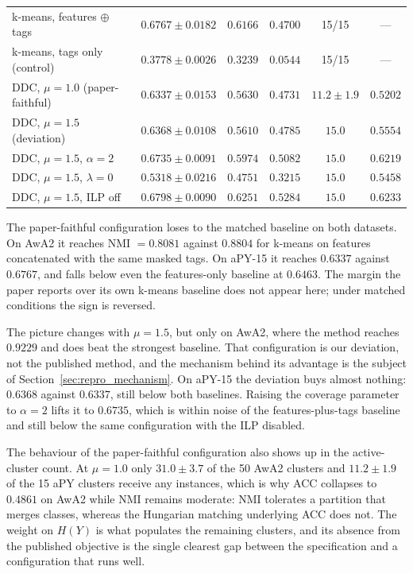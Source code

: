 \begin{table}[H]
\begin{tabular}{lccccc}
        k-means, features $\oplus$ tags & $\mathbf{0.6767 \pm 0.0182}$ & $0.6166$ & $0.4700$ & 15/15 & --- \\
        k-means, tags only (control) & $0.3778 \pm 0.0026$ & $0.3239$ & $0.0544$ & 15/15 & --- \\
        DDC, $\mu = 1.0$ (paper-faithful) & $0.6337 \pm 0.0153$ & $0.5630$ & $0.4731$ & $11.2 \pm 1.9$ & $0.5202$ \\
        DDC, $\mu = 1.5$ (deviation) & $0.6368 \pm 0.0108$ & $0.5610$ & $0.4785$ & $15.0$ & $0.5554$ \\
        DDC, $\mu = 1.5$, $\alpha = 2$ & $0.6735 \pm 0.0091$ & $0.5974$ & $0.5082$ & $15.0$ & $0.6219$ \\
        DDC, $\mu = 1.5$, $\lambda = 0$ & $0.5318 \pm 0.0216$ & $0.4751$ & $0.3215$ & $15.0$ & $0.5458$ \\
        DDC, $\mu = 1.5$, ILP off & $\mathbf{0.6798 \pm 0.0090}$ & $0.6251$ & $0.5284$ & $15.0$ & $0.6233$ \\
        \hline
    \end{tabular}
\end{table}


The paper-faithful configuration loses to the matched baseline on both datasets. On AwA2 it reaches NMI $= 0.8081$ against $0.8804$ for k-means on features concatenated with the same masked tags. On aPY-15 it reaches $0.6337$ against $0.6767$, and falls below even the features-only baseline at $0.6463$. The margin the paper reports over its own k-means baseline does not appear here; under matched conditions the sign is reversed.

The picture changes with $\mu = 1.5$, but only on AwA2, where the method reaches $0.9229$ and does beat the strongest baseline. That configuration is our deviation, not the published method, and the mechanism behind its advantage is the subject of Section~\ref{sec:repro_mechanism}. On aPY-15 the deviation buys almost nothing: $0.6368$ against $0.6337$, still below both baselines. Raising the coverage parameter to $\alpha = 2$ lifts it to $0.6735$, which is within noise of the features-plus-tags baseline and still below the same configuration with the ILP disabled.

The behaviour of the paper-faithful configuration also shows up in the active-cluster count. At $\mu = 1.0$ only $31.0 \pm 3.7$ of the 50 AwA2 clusters and $11.2 \pm 1.9$ of the 15 aPY clusters receive any instances, which is why ACC collapses to $0.4861$ on AwA2 while NMI remains moderate: NMI tolerates a partition that merges classes, whereas the Hungarian matching underlying ACC does not. The weight on $H(Y)$ is what populates the remaining clusters, and its absence from the published objective is the single clearest gap between the specification and a configuration that runs well.


